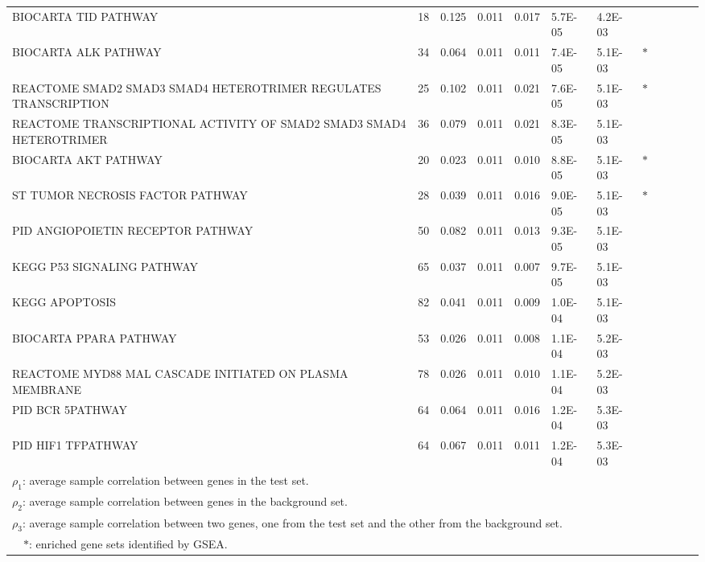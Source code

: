 \documentclass[useAMS,usenatbib, galley]{biom}
\begin{document}
\begin{table*}[ht]
\begin{tabular}{p{3in}rp{0.5in}p{0.5in}rp{0.5in}p{0.5in}rp{0.5in}p{0.5in}lp{0.1in}}
			BIOCARTA TID PATHWAY & 18 & 0.125 & 0.011 & 0.017 & 5.7E-05 & 4.2E-03 &  \\ 
			BIOCARTA ALK PATHWAY & 34 & 0.064 & 0.011 & 0.011 & 7.4E-05 & 5.1E-03 & $\ast$ \\ 
			REACTOME SMAD2 SMAD3 SMAD4 HETEROTRIMER REGULATES TRANSCRIPTION & 25 & 0.102 & 0.011 & 0.021 & 7.6E-05 & 5.1E-03 & $\ast$ \\ 
			REACTOME TRANSCRIPTIONAL ACTIVITY OF SMAD2 SMAD3 SMAD4 HETEROTRIMER & 36 & 0.079 & 0.011 & 0.021 & 8.3E-05 & 5.1E-03 &  \\ 
			BIOCARTA AKT PATHWAY & 20 & 0.023 & 0.011 & 0.010 & 8.8E-05 & 5.1E-03 & $\ast$ \\ 
			ST TUMOR NECROSIS FACTOR PATHWAY & 28 & 0.039 & 0.011 & 0.016 & 9.0E-05 & 5.1E-03 & $\ast$ \\ 
			PID ANGIOPOIETIN RECEPTOR PATHWAY & 50 & 0.082 & 0.011 & 0.013 & 9.3E-05 & 5.1E-03 &  \\ 
			KEGG P53 SIGNALING PATHWAY & 65 & 0.037 & 0.011 & 0.007 & 9.7E-05 & 5.1E-03 &  \\ 
			KEGG APOPTOSIS & 82 & 0.041 & 0.011 & 0.009 & 1.0E-04 & 5.1E-03 &  \\ 
			BIOCARTA PPARA PATHWAY & 53 & 0.026 & 0.011 & 0.008 & 1.1E-04 & 5.2E-03 &  \\ 
			REACTOME MYD88 MAL CASCADE INITIATED ON PLASMA MEMBRANE & 78 & 0.026 & 0.011 & 0.010 & 1.1E-04 & 5.2E-03 &  \\ 
			PID BCR 5PATHWAY & 64 & 0.064 & 0.011 & 0.016 & 1.2E-04 & 5.3E-03 &  \\ 
			PID HIF1 TFPATHWAY & 64 & 0.067 & 0.011 & 0.011 & 1.2E-04 & 5.3E-03 &  \\ 
			\hline
			\multicolumn{7}{l}{$\rho_1$: average sample correlation between genes in the test set. }	 \\	
			\multicolumn{7}{l}{$\rho_2$: average sample correlation between genes in the background set. }	 \\	
			\multicolumn{7}{l}{$\rho_3$: average sample correlation between two genes, one from the test set and the other from the background set. }	 \\	
			\multicolumn{7}{l}{ ~~$\ast$: enriched gene sets identified by GSEA.}	 \\	
		\hline\hline
	\end{tabular}
	\label{table:top30}
\end{table*}

	
	
	
%	
	
\end{document}
